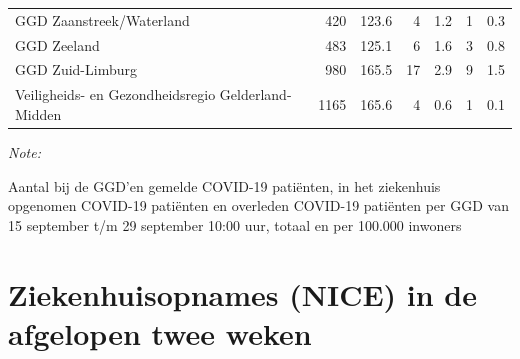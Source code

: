 \documentclass[
  english,
  man,floatsintext]{apa6}
\begin{document}
\begin{table}
\begin{threeparttable}
\begin{tabular}{lrrrrrr}
GGD Zaanstreek/Waterland & 420 & 123.6 & 4 & 1.2 & 1 & 0.3\\
GGD Zeeland & 483 & 125.1 & 6 & 1.6 & 3 & 0.8\\
GGD Zuid-Limburg & 980 & 165.5 & 17 & 2.9 & 9 & 1.5\\
Veiligheids- en Gezondheidsregio Gelderland-Midden & 1165 & 165.6 & 4 & 0.6 & 1 & 0.1\\
\bottomrule
\end{tabular}
\begin{tablenotes}
\item \textit{Note: } 
\item Aantal bij de GGD’en gemelde COVID-19 patiënten, in het ziekenhuis opgenomen COVID-19 patiënten en overleden COVID-19 patiënten per GGD van 15 september t/m 29 september 10:00 uur, totaal en per 100.000 inwoners
\end{tablenotes}
\end{threeparttable}
\endgroup{}
\end{table}

\newpage

\hypertarget{ziekenhuisopnames-nice-in-de-afgelopen-twee-weken}{%
\section{Ziekenhuisopnames (NICE) in de afgelopen twee weken}\label{ziekenhuisopnames-nice-in-de-afgelopen-twee-weken}}
\end{document}
